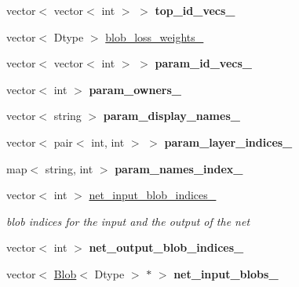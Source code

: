 \begin{DoxyCompactItemize}
vector$<$ vector$<$ int $>$ $>$ {\bfseries top\+\_\+id\+\_\+vecs\+\_\+}
\item 
vector$<$ Dtype $>$ \mbox{\hyperlink{classcaffe_1_1_net_a617731b68e56a18f7904d7d2322e6309}{blob\+\_\+loss\+\_\+weights\+\_\+}}
\item 
\mbox{\label{classcaffe_1_1_net_aee87985beae57a80bb7530f9d907b4f8}} 
vector$<$ vector$<$ int $>$ $>$ {\bfseries param\+\_\+id\+\_\+vecs\+\_\+}
\item 
\mbox{\label{classcaffe_1_1_net_a7d2eacec33c8b1d9effb02b4327f65d5}} 
vector$<$ int $>$ {\bfseries param\+\_\+owners\+\_\+}
\item 
\mbox{\label{classcaffe_1_1_net_a0a4b357f75f3266654804fcde207dd5d}} 
vector$<$ string $>$ {\bfseries param\+\_\+display\+\_\+names\+\_\+}
\item 
\mbox{\label{classcaffe_1_1_net_a35da4eea28ecfebaff61bdf650fe21f9}} 
vector$<$ pair$<$ int, int $>$ $>$ {\bfseries param\+\_\+layer\+\_\+indices\+\_\+}
\item 
\mbox{\label{classcaffe_1_1_net_ac6b2e96d68deb383c4f90acaf486501c}} 
map$<$ string, int $>$ {\bfseries param\+\_\+names\+\_\+index\+\_\+}
\item 
\mbox{\label{classcaffe_1_1_net_abfd9d33aba24ec6e415542710dadf644}} 
vector$<$ int $>$ \mbox{\hyperlink{classcaffe_1_1_net_abfd9d33aba24ec6e415542710dadf644}{net\+\_\+input\+\_\+blob\+\_\+indices\+\_\+}}
\begin{DoxyCompactList}\small\item\em blob indices for the input and the output of the net \end{DoxyCompactList}\item 
\mbox{\label{classcaffe_1_1_net_a8a61083308ff6bd21cd9e3d7be85f8d5}} 
vector$<$ int $>$ {\bfseries net\+\_\+output\+\_\+blob\+\_\+indices\+\_\+}
\item 
\mbox{\label{classcaffe_1_1_net_a7c5d2ffa75f94fdbcfe0c23702cb07d9}} 
vector$<$ \mbox{\hyperlink{classcaffe_1_1_blob}{Blob}}$<$ Dtype $>$ $\ast$ $>$ {\bfseries net\+\_\+input\+\_\+blobs\+\_\+}

\end{DoxyCompactItemize}
